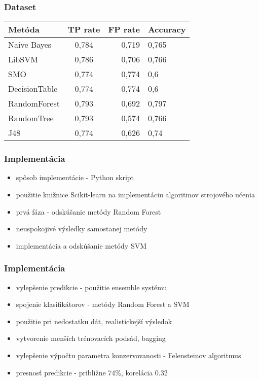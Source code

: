\documentclass[10pt,xcolor=pdflatex]{beamer}
\begin{document}
\begin{frame}\frametitle{Dataset}
\begin{center}
	\begin{tabular}{ | l | c | r | l| }
		\hline 
		Metóda & TP rate & FP rate & Accuracy \\ \hline
		Naive Bayes & 0,784 & 0,719 & 0,765 \\ \hline
		LibSVM &  0,786   & 0,706   & 0,766  \\ \hline
		SMO & 0,774 & 0,774 & 0,6\\ \hline
		DecisionTable & 0,774 & 0,774 & 0,6\\ \hline
		RandomForest & 0,793 & 0,692 & 0,797\\ \hline
		RandomTree & 0,793 & 0,574 & 0,766\\ \hline
		J48 & 0,774 & 0,626 & 0,74\\ \hline
		
	\end{tabular}
\end{center}
\end{frame}



\begin{frame}\frametitle{Implementácia}
	\begin{itemize}
		\item spôsob implementácie - Python skript
		\item použitie knižnice Scikit-learn na implementáciu algoritmov strojového učenia
		\item prvá fáza - odskúšanie metódy Random Forest
		\item neuspokojivé výsledky samostanej metódy
		\item implementácia a odskúšanie metódy SVM 
	\end{itemize}

\end{frame}

\begin{frame}\frametitle{Implementácia}
\begin{itemize}
	\item vylepšenie predikcie - použitie ensemble systému
	\item spojenie klasifikátorov - metódy Random Forest a SVM
	\item použitie pri nedostatku dát, realistickejší výsledok
	\item vytvorenie menších trénovacích podsád, bagging
	\item vylepšenie výpočtu parametra konzervovanosti - Felensteinov algoritmus
	\item presnosť predikcie - približne 74\%, korelácia 0.32
\end{itemize}

\end{frame}
\end{document}

